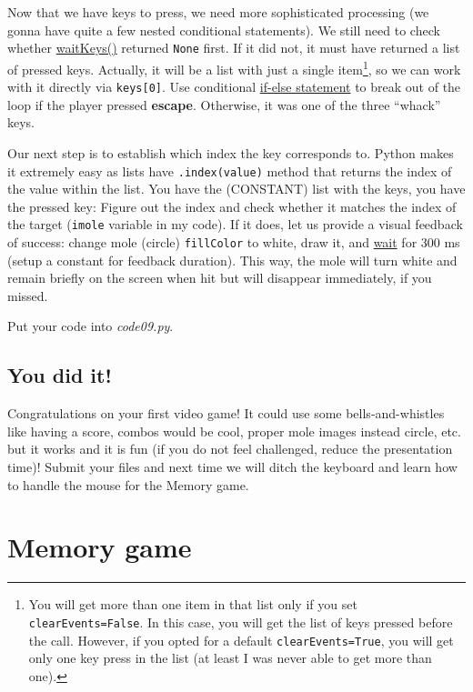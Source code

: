 \documentclass[
]{book}
\begin{document}
Now that we have keys to press, we need more sophisticated processing (we gonna have quite a few nested conditional statements). We still need to check whether \href{https://psychopy.org/api/event.html\#psychopy.event.waitKeys}{waitKeys()} returned \texttt{None} first. If it did not, it must have returned a list of pressed keys. Actually, it will be a list with just a single item\footnote{You will get more than one item in that list only if you set \texttt{clearEvents=False}. In this case, you will get the list of keys pressed before the call. However, if you opted for a default \texttt{clearEvents=True}, you will get only one key press in the list (at least I was never able to get more than one).}, so we can work with it directly via \texttt{keys{[}0{]}}. Use conditional \protect\hyperlink{if-statement}{if-else statement} to break out of the loop if the player pressed \textbf{escape}. Otherwise, it was one of the three ``whack'' keys.

Our next step is to establish which index the key corresponds to. Python makes it extremely easy as lists have \texttt{.index(value)} method that returns the index of the value within the list. You have the (CONSTANT) list with the keys, you have the pressed key: Figure out the index and check whether it matches the index of the target (\texttt{imole} variable in my code). If it does, let us provide a visual feedback of success: change mole (circle) \texttt{fillColor} to white, draw it, and \href{https://psychopy.org/api/clock.html\#psychopy.clock.wait}{wait} for 300 ms (setup a constant for feedback duration). This way, the mole will turn white and remain briefly on the screen when hit but will disappear immediately, if you missed.

Put your code into \emph{code09.py}.

\hypertarget{you-did-it}{%
\section{You did it!}\label{you-did-it}}

Congratulations on your first video game! It could use some bells-and-whistles like having a score, combos would be cool, proper mole images instead circle, etc. but it works and it is fun (if you do not feel challenged, reduce the presentation time)! Submit your files and next time we will ditch the keyboard and learn how to handle the mouse for the Memory game.

\hypertarget{memory-game}{%
\chapter{Memory game}\label{memory-game}}
\end{document}

